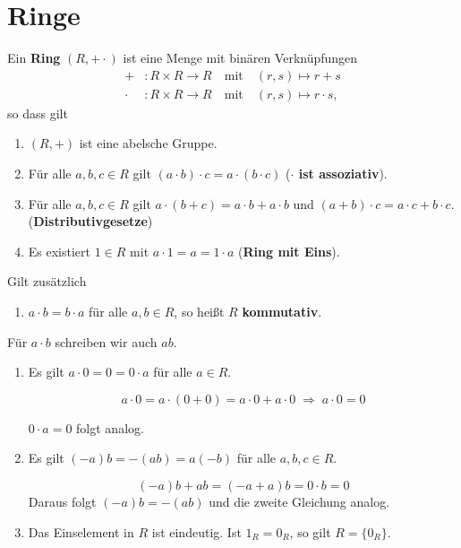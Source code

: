\section{Ringe}
\begin{definition}
	Ein \textbf{Ring} $(R, + \cdot)$ ist eine Menge mit binären Verknüpfungen
	\begin{align*}
		+ &\colon R \times R \to R \quad\text{mit}\quad (r,s) \mapsto r+s\\
		\cdot &\colon R \times R \to R \quad\text{mit}\quad (r,s) \mapsto r\cdot s,
	\end{align*}
	so dass gilt
	\begin{enumerate}[label={\bfseries(R\arabic*)}]
		\item\label{rng1} $(R,+)$ ist eine abelsche Gruppe.
		\item\label{rng2} Für alle $a,b,c \in R$ gilt $(a \cdot b) \cdot c = a \cdot (b \cdot c)$ (\textbf{$\cdot$ ist assoziativ}).
		\item\label{rng3} Für alle $a,b,c \in R$ gilt $a\cdot (b+c) = a\cdot b + a\cdot b$ und $(a+b)\cdot c = a\cdot c + b \cdot c$. (\textbf{Distributivgesetze})
		\item\label{rng4} Es existiert $1 \in R$ mit $a \cdot 1 = a = 1 \cdot a$ (\textbf{Ring mit Eins}).
	
	\end{enumerate}
	Gilt zusätzlich
	\begin{enumerate}[label={\bfseries(R\arabic*)}, start=5]
		\item\label{rng5} $a \cdot b = b \cdot a$ für alle $a,b \in R$, so heißt $R$ \textbf{kommutativ}.
	\end{enumerate}
	
	
\end{definition}
Für $a \cdot b$ schreiben wir auch $ab$.
\begin{rem}\label{rem4_2}
	\begin{enumerate}[label=(\roman*)]
		\item Es gilt $a \cdot 0 = 0 = 0 \cdot a$ für alle $a \in R$.
		\begin{inlproof}
			\[a \cdot 0 = a \cdot (0 + 0) = a \cdot 0 + a \cdot 0 \;\Rightarrow\; a \cdot 0 = 0\]
		\end{inlproof}
		$0 \cdot a = 0$ folgt analog.
		\item Es gilt $(-a)b = -(ab) = a(-b)$ für alle $a,b,c \in R$.
		\begin{inlproof}
			\[(-a)b + ab = (-a + a) b = 0 \cdot b = 0\]
				Daraus folgt $(-a)b = -(ab)$ und die zweite Gleichung analog.
		\end{inlproof}
	
		\item Das Einselement in $R$ ist eindeutig. Ist $1_R = 0_R$, so gilt $R = \{0_R\}$.
	\end{enumerate}
\end{rem}
